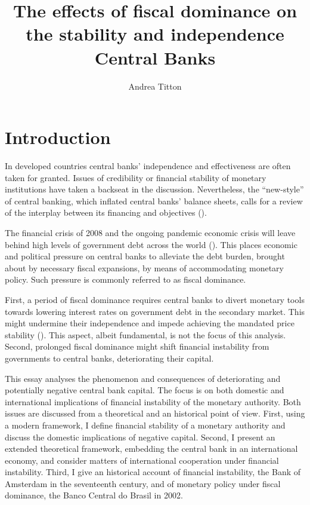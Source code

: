\documentclass[american]{scrartcl}
\title{The effects of fiscal dominance on the stability and independence Central Banks}
\author{Andrea Titton}
\begin{document}
\clearpage
\thispagestyle{empty}
\maketitle
\clearpage



\section{Introduction}

In developed countries central banks' independence and effectiveness are often taken for granted. Issues of credibility or financial stability of monetary institutions have taken a backseat in the discussion. Nevertheless, the ``new-style'' of central banking, which inflated central banks' balance sheets, calls for a review of the interplay between its financing and objectives (\cite{Hall2015}).

The financial crisis of 2008 and the ongoing pandemic economic crisis will leave behind high levels of government debt across the world (\cite{WEO2020}). This places economic and political pressure on central banks to alleviate the debt burden, brought about by necessary fiscal expansions, by means of accommodating monetary policy. Such pressure is commonly referred to as fiscal dominance.

First, a period of fiscal dominance requires central banks to divert monetary tools towards lowering interest rates on government debt in the secondary market. This might undermine their independence and impede achieving the mandated price stability (\cite{FernandezAlbertos2015}). This aspect, albeit fundamental, is not the focus of this analysis. Second, prolonged fiscal dominance might shift financial instability from governments to central banks, deteriorating their capital.

This essay analyses the phenomenon and consequences of deteriorating and potentially negative central bank capital. The focus is on both domestic and international implications of financial instability of the monetary authority. Both issues are discussed from a theoretical and an historical point of view. First, using a modern framework, I define financial stability of a monetary authority and discuss the domestic implications of negative capital. Second, I present an extended theoretical framework, embedding the central bank in an international economy, and consider matters of international cooperation under financial instability. Third, I give an historical account of financial instability, the Bank of Amsterdam in the seventeenth century, and of monetary policy under fiscal dominance, the Banco Central do Brasil in 2002.
\end{document}
